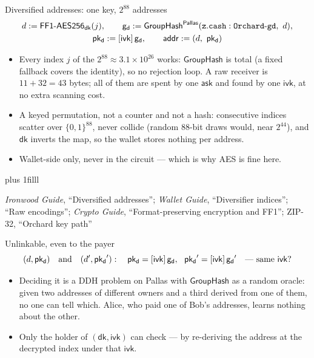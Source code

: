 \documentclass[aspectratio=169,11pt]{beamer}
\newcommand{\gd}{\ensuremath{\mathsf{g_d}}}
\newcommand{\pkd}{\ensuremath{\mathsf{pk_d}}}
\newcommand{\asksym}{\ensuremath{\mathsf{ask}}}
\newcommand{\ivk}{\ensuremath{\mathsf{ivk}}}
\newcommand{\dk}{\ensuremath{\mathsf{dk}}}
\newcommand{\GroupHash}{\ensuremath{\mathsf{GroupHash}}}
\newcommand{\src}[1]{\par\vskip0pt plus 1filll
  {\fontsize{6}{7.2}\selectfont\color{arbdim}\raggedright #1\par}}
\begin{document}
\begin{frame}{Diversified addresses: one key, $2^{88}$ addresses}
\begin{gather*}
d := \Dff_{\dk}(j), \qquad
\gd := \Dgh, \\
\pkd := [\ivk]\,\gd, \qquad \mathsf{addr} := (d,\ \pkd)
\end{gather*}
\begin{itemize}
  \item Every index $j$ of the $2^{88} \approx 3.1 \times 10^{26}$ works:
    $\GroupHash$ is total (a fixed fallback covers the identity), so no
    rejection loop. A raw receiver is $11 + 32 = 43$ bytes; all of them
    are spent by one \asksym{} and found by one \ivk, at no extra scanning
    cost.
  \item A keyed permutation, not a counter and not a hash: consecutive
    indices scatter over $\{0,1\}^{88}$, never collide (random 88-bit
    draws would, near $2^{44}$), and \dk{} inverts the map, so the wallet
    stores nothing per address.
  \item Wallet-side only, never in the circuit --- which is why AES is
    fine here.
\end{itemize}
\src{\emph{Ironwood Guide}, ``Diversified addresses''; \emph{Wallet Guide},
``Diversifier indices''; ``Raw encodings''; \emph{Crypto Guide},
``Format-preserving encryption and FF1''; ZIP-32, ``Orchard key path''}
\end{frame}

\begin{frame}{Unlinkable, even to the payer}
\[
(d, \pkd) \quad\text{and}\quad (d', \pkd'):
\quad \pkd = [\ivk]\,\gd,\ \ \pkd' = [\ivk]\,\gd'
\quad\text{--- same \ivk?}
\]
\begin{itemize}
  \item Deciding it is a DDH problem on Pallas with $\GroupHash$ as a
    random oracle: given two addresses of different owners and a third
    derived from one of them, no one can tell which. Alice, who paid one
    of Bob's addresses, learns nothing about the other.
  \item Only the holder of $(\dk, \ivk)$ can check --- by re-deriving the
    address at the decrypted index under that \ivk.
\end{itemize}
\end{frame}
\end{document}
